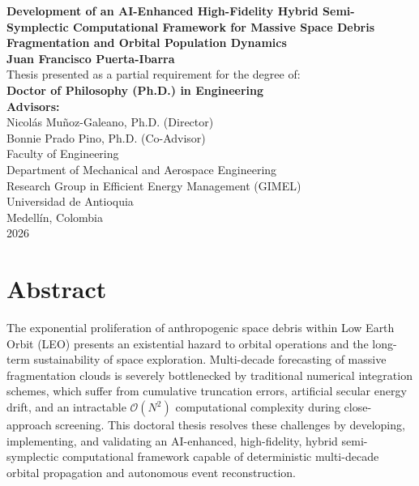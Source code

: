 \documentclass[12pt,letterpaper,twoside]{book}
\begin{document}
\frontmatter

\begin{titlepage}
\begin{center}
    \vspace*{0.5cm}
    \Huge
    \textbf{Development of an AI-Enhanced High-Fidelity Hybrid Semi-Symplectic Computational Framework for Massive Space Debris Fragmentation and Orbital Population Dynamics} \\[1.5cm]
    
    \Large
    \textbf{Juan Francisco Puerta-Ibarra} \\[2.0cm]
    
    \large
    Thesis presented as a partial requirement for the degree of: \\
    \textbf{Doctor of Philosophy (Ph.D.) in Engineering} \\[2.0cm]
    
    \textbf{Advisors:} \\
    Nicolás Muñoz-Galeano, Ph.D. (Director) \\
    Bonnie Prado Pino, Ph.D. (Co-Advisor) \\[2.0cm]
    
    \large
    Faculty of Engineering \\
    Department of Mechanical and Aerospace Engineering \\
    Research Group in Efficient Energy Management (GIMEL) \\
    Universidad de Antioquia \\
    Medellín, Colombia \\
    2026
\end{center}
\end{titlepage}

\cleardoublepage

\chapter*{Abstract}

The exponential proliferation of anthropogenic space debris within Low Earth Orbit (LEO) presents an existential hazard to orbital operations and the long-term sustainability of space exploration. Multi-decade forecasting of massive fragmentation clouds is severely bottlenecked by traditional numerical integration schemes, which suffer from cumulative truncation errors, artificial secular energy drift, and an intractable $\mathcal{O}(N^2)$ computational complexity during close-approach screening. This doctoral thesis resolves these challenges by developing, implementing, and validating an AI-enhanced, high-fidelity, hybrid semi-symplectic computational framework capable of deterministic multi-decade orbital propagation and autonomous event reconstruction.
\end{document}
